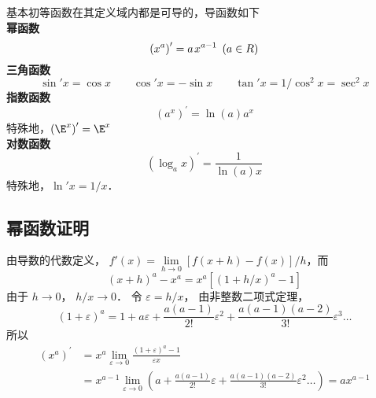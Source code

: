 基本初等函数在其定义域内都是可导的，导函数如下\\
\textbf{幂函数}
\begin{equation}
{\left( {{x^a}} \right)^\prime } = a{\kern 1pt} {x^{a - 1}}{\kern 1pt} {\kern 1pt} {\kern 1pt} \left( {a \in R} \right)
\end{equation}
\textbf{三角函数}
\begin{equation}
\sin' x = \cos x \qquad \cos' x =  - \sin x \qquad
\tan'x = 1/{\cos ^2}x = {\sec ^2}x
\end{equation}
\textbf{指数函数}
\begin{equation}
{\left( {{a^x}} \right)^\prime } = \ln \left( a \right){a^x}
\end{equation}
特殊地，${\left( {{\E^x}} \right)^\prime } = {\E^x}$\\
\textbf{对数函数}
\begin{equation}
{\left( {{{\log }_a}x} \right)^\prime } = \frac{1}{{\ln \left( a \right)x}}
\end{equation}
特殊地，$\ln' x= 1/x$．

\subsection{幂函数证明}
由导数的代数定义， $f'\left( x \right) = \mathop {\lim }\limits_{h \to 0} [{f\left( {x + h} \right) - f\left( x \right)}]/{h}$，而
\begin{equation}
{\left( {x + h} \right)^a} - {x^a} = {x^a}[{\left( {1 + h/x} \right)^a} - 1]
\end{equation}
由于 $h \to 0$，  $h/x \to 0$． 令 $\varepsilon  = h/x$， 由非整数二项式定理，
\begin{equation}
{\left( {1 + \varepsilon } \right)^a} = 1 + a\varepsilon  + \frac{{a\left( {a - 1} \right)}}{{2!}}{\varepsilon ^2} + \frac{{a\left( {a - 1} \right)\left( {a - 2} \right)}}{{3!}}{\varepsilon ^3}\dots
\end{equation}
所以
\begin{equation}\begin{aligned}
{\left( {{x^a}} \right)^\prime } &= {x^a}\mathop {\lim }\limits_{\varepsilon  \to 0} \frac{{{{\left( {1 + \varepsilon } \right)}^a} - 1}}{{\varepsilon x}} \\
&= {x^{a - 1}}\mathop {\lim }\limits_{\varepsilon  \to 0} \left( {a + \frac{{a\left( {a - 1} \right)}}{{2!}}\varepsilon  + \frac{{a\left( {a - 1} \right)\left( {a - 2} \right)}}{{3!}}{\varepsilon ^2}\dots} \right) = a{x^{a - 1}}
\end{aligned}\end{equation}

